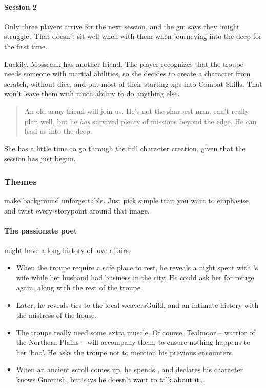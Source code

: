 \begin{multicols}{2}
\begin{exampletext}
\end{exampletext}

\begin{exampletext}
  \paragraph{Session 2}
  Only three players arrive for the next session, and the \gls{gm} says they `might struggle'.
  That doesn't sit well when with them when journeying into the \gls{deep} for the first time.

  Luckily, Mossrank has another friend.
  The player recognizes that the troupe needs someone with martial abilities, so she decides to create a character from scratch, without dice, and put most of their starting \glspl{xp} into Combat Skills.
  That won't leave them with much ability to do anything else.

  \begin{quotation}
    An old army friend will join us.
    He's not the sharpest man, can't really plan well, but he \emph{has} survived plenty of missions beyond the \gls{edge}.
    He can lead us into the \gls{deep}.
  \end{quotation}

  She has a little time to go through the full character creation, given that the session has just begun.
\end{exampletext}

\subsubsection{Themes}
make  background unforgettable.
Just pick simple trait you want to emphasise, and twist every \gls{storypoint} around that image.

\paragraph{The passionate poet}
might have a long history of love-affairs.

\begin{itemize}
  \item
  When the troupe require a safe place to rest, he reveals a night spent with 's wife while her husband had business in the city.
  He could ask her for refuge again, along with the rest of the troupe.
  \item
  Later, he reveals ties to the local \gls{weaversGuild}, and an intimate history with the mistress of the house.
  \item
  The troupe really need some extra muscle.
  Of course, Tealmoor -- warrior of the Northern Plains -- will accompany them, to ensure nothing happens to her `boo'.
  He asks the troupe not to mention his previous encounters.
  \item
  When an ancient scroll comes up, he spends , and declares his character knows Gnomish, but says he doesn't want to talk about it\ldots
\end{itemize}


\end{multicols}
